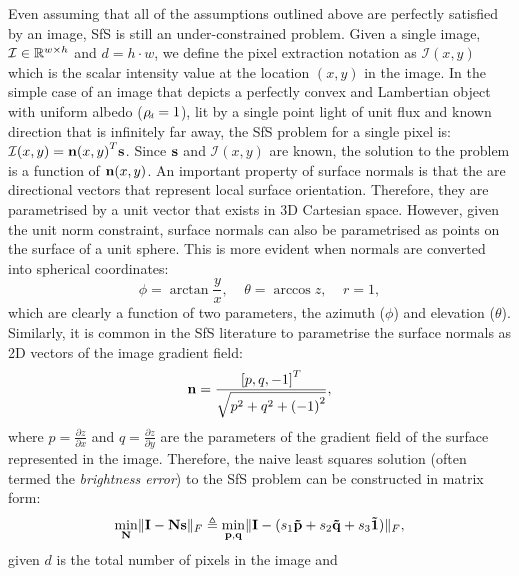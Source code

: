 Even assuming that all of the assumptions outlined above are perfectly
satisfied by an image, SfS is still an under-constrained problem. Given
a single image, $\mathcal{I} \in \mathbb{R}^{w \times h}$ and $d = h \cdot w$, we define
the pixel extraction notation as $\mathcal{I}(x, y)$ which is the scalar
intensity value at the location $(x, y)$ in the image. In the
simple case of an image that depicts a perfectly convex and Lambertian
object with uniform albedo ($\rho_{\smallsub{d}} = 1$), lit by a single
point light of unit flux and known direction that is infinitely far away, the
SfS problem for a single pixel is: $\mathcal{I}(x, y) = {\boldsymbol{\mathbf{n}}(x, y)}^T \boldsymbol{\mathbf{s}}$.
Since $\boldsymbol{\mathbf{s}}$ and $\mathcal{I}(x, y)$ are known, the solution to the problem is a
function of $\boldsymbol{\mathbf{n}}(x, y)$. An important property of surface normals is that the are
directional vectors that represent local surface orientation. Therefore, they
are parametrised by a unit vector that exists in 3D Cartesian space. However, given the unit norm constraint, surface normals can
also be parametrised as points on the surface of a unit sphere. This is more
evident when normals are converted into spherical coordinates:
\begin{equation}\label{eq:bg_sfs_normal_spherical}
    \phi = \arctan{\frac{y}{x}}, \;\;\;\; \theta = \arccos{z}, \;\;\;\; r = 1,
\end{equation}
which are clearly a function of two parameters, the azimuth ($\phi$) and
elevation ($\theta$). Similarly, it is common in the SfS literature to
parametrise the surface normals as 2D vectors of the image gradient field:
\begin{equation}\label{eq:bg_sfs_normal_pq}
    \boldsymbol{\mathbf{n}} = \frac{{[p, q, -1]}^T}{\sqrt{p^2 + q^2 + {(-1)}^2}},
\end{equation}
where $p = \frac{\partial z}{\partial x}$ and
$q = \frac{\partial z}{\partial y}$ are the parameters of the gradient field
of the surface represented in the image. Therefore, the naive least squares
solution (often termed the \textit{brightness error}) to the SfS problem can be
constructed in matrix form:
\begin{equation}\label{eq:bg_sfs_least_squares_lambert}
    \min_{\boldsymbol{\mathbf{N}}} \lVert \boldsymbol{\mathbf{I}} - \boldsymbol{\mathbf{N}} \boldsymbol{\mathbf{s}} \rVert_F \triangleq
    \min_{\boldsymbol{\mathbf{p}}, \boldsymbol{\mathbf{q}}} \lVert \boldsymbol{\mathbf{I}} - (s_1 \boldsymbol{\mathbf{\tilde{p}}} + s_2 \boldsymbol{\mathbf{\tilde{q}}} + s_3 \boldsymbol{\mathbf{\tilde{1}}}) \rVert_F,
\end{equation}
given $d$ is the total number of pixels in the image and
